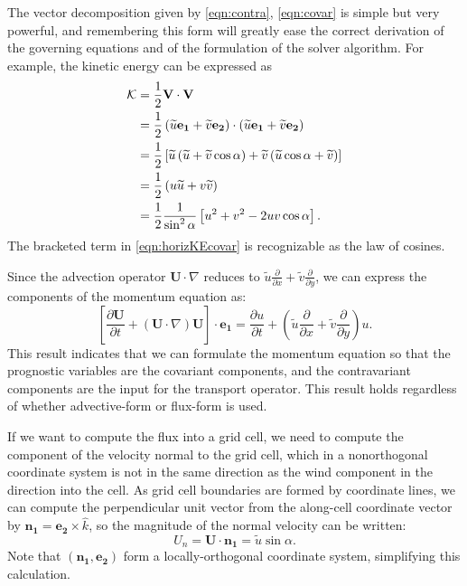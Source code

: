 \documentclass[10pt,letterpaper,margin=1in]{memoir}
\begin{document}
The vector decomposition given by \eqref{eqn:contra}, \eqref{eqn:covar} is simple but very powerful, and remembering this form will greatly ease the correct derivation of the governing equations and of the formulation of the solver algorithm. For example, the kinetic energy can be expressed as 
\begin{subequations}
\begin{align} 
\mathcal{K} &=  \frac{1}{2} \mathbf{V} \cdot \mathbf{V}\notag  \\ 
	&= \frac{1}{2} \left ( \widetilde{u} \mathbf{e_1} + \widetilde{v} \mathbf{e_2} \right ) \cdot \left ( \widetilde{u} \mathbf{e_1} + \widetilde{v} \mathbf{e_2} \right ) \notag \\ 
	&= \frac{1}{2} \left [ \widetilde{u} \left ( \widetilde{u} + \widetilde{v} \cos \alpha \right ) + \widetilde{v} \left ( \widetilde{u} \cos \alpha + \widetilde{v} \right ) \right ] \notag \\ 
	&= \frac{1}{2} \left ( u\widetilde{u} + v\widetilde{v} \right ) \label{eqn:horizKE} \\
	& = \frac{1}{2} \frac{1}{\sin^2\alpha} \left [ u^2 + v^2 - 2 u v \cos \alpha \right ] . \label{eqn:horizKEcovar}
\end{align}
\end{subequations}
The bracketed term in \eqref{eqn:horizKEcovar} is recognizable as the law of cosines.

Since the advection operator $\mathbf{U} \cdot \nabla$ reduces to $\widetilde{u}\frac{\partial}{\partial x} + \widetilde{v}\frac{\partial }{\partial y}$, we can express the components of the momentum equation as:
\begin{equation} \label{eqn:advComponents}
\left [ \frac{\partial \mathbf{U}}{\partial t} +  \left ( \mathbf{U} \cdot \nabla \right ) \mathbf{U} \right ] \cdot \mathbf{e_1} = \frac{\partial u}{\partial t} +  \left ( \widetilde{u}\frac{\partial}{\partial x} + \widetilde{v}\frac{\partial}{\partial y} \right ) u.
\end{equation}
This result indicates that we can formulate the momentum equation so that the prognostic variables are the covariant components, and the contravariant components are  the input for the transport operator. This result holds regardless of whether advective-form or flux-form is used. 

If we want to compute the flux into a grid cell, we need to compute the component of the velocity normal to the grid cell, which in a nonorthogonal coordinate system is not in the same direction as the wind component in the direction into the cell. As  grid cell boundaries are formed by coordinate lines, we can compute the perpendicular unit vector from the along-cell coordinate vector by $\mathbf{n_1} = \mathbf{e_2} \times \hat{k}$, so the magnitude of the normal velocity can be written:
\begin{equation} \label{eqn:unormal}
U_n =  \mathbf{U} \cdot \mathbf{n_1}  =  \widetilde{u} \sin \alpha.
\end{equation} 
Note that $\left ( \mathbf{n_1}, \mathbf{e_2} \right )$ form a locally-orthogonal coordinate system, simplifying this calculation.
\end{document}
